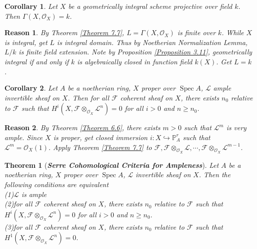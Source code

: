 \documentclass{ctexart}
\newtheorem{theorem}{Theorem}[section]
\newtheorem{reason}{Reason}[section]
\newtheorem{corollary}{Corollary}[section]
\newcommand{\spec}{\operatorname{Spec}}
\begin{document}
\begin{corollary}
    Let $X$ be a geometrically integral scheme projective over field $k$.
    Then $\Gamma(X, \mathcal{O}_{X}) = k$.
    \label{Corollary 7.9} 
\end{corollary}
\begin{reason}
    By Theorem \ref{Theorem 7.7}, $L = \Gamma(X, \mathcal{O}_{X})$ is finite over $k$.
    While $X$ is integral, get $L$ is integral domain.
    Thus by Noetherian Normalization Lemma, $L/k$ is finite field extension.
    Note by Proposition \ref{Proposition 3.11}, geometrically integral if and only if $k$ is algebraically closed in function field $k(X)$.
    Get $L = k$.
\end{reason}
\begin{corollary}
    Let $A$ be a noetherian ring, $X$ proper over $\spec A$, $\mathcal{L}$ ample invertible sheaf on $X$.
    Then for all $\mathcal{F}$ coherent sheaf on $X$, there exists $n_{0}$ relative to $\mathcal{F}$ such that $H^{i}(X, \mathcal{F} \otimes_{\mathcal{O}_{X}} \mathcal{L}^{n}) = 0$ for all $i > 0$ and $n \ge n_{0}$. 
    \label{Corollary 7.10}
\end{corollary}
\begin{reason}
    By Theorem \ref{Theorem 6.6}, there exists $m > 0$ such that $\mathcal{L}^{m}$ is very ample.
    Since $X$ is proper, get closed immersion $i: X \hookrightarrow \mathbb{P}_{A}^{r}$ such that $\mathcal{L}^{m} = \mathcal{O}_{X}(1)$.
    Apply Theorem \ref{Theorem 7.7} to $\mathcal{F}, \mathcal{F} \otimes_{\mathcal{O}_{X}} \mathcal{L}, \cdots, \mathcal{F} \otimes_{\mathcal{O}_{X}} \mathcal{L}^{m - 1}$.
\end{reason}
\begin{theorem}[\textbf{\emph{Serre Cohomological Criteria for Ampleness}}]
    Let $A$ be a noetherian ring, $X$ proper over $\spec A$, $\mathcal{L}$ invertible sheaf on $X$.
    Then the following conditions are equivalent \\
    (1)$\mathcal{L}$ is ample \\
    (2)for all $\mathcal{F}$ coherent sheaf on $X$, 
    there exists $n_{0}$ relative to $\mathcal{F}$ such that $H^{i}(X, \mathcal{F} \otimes_{\mathcal{O}_{X}} \mathcal{L}^{n}) = 0$ for all $i > 0$ and $n \ge n_{0}$. \\
    (3)for all $\mathcal{F}$ coherent sheaf on $X$, 
    there exists $n_{0}$ relative to $\mathcal{F}$ such that $H^{1}(X, \mathcal{F} \otimes_{\mathcal{O}_{X}} \mathcal{L}^{n}) = 0$.
    \vspace{-\baselineskip} %
    \label{Theorem 7.9}
\end{theorem}
\end{document}
